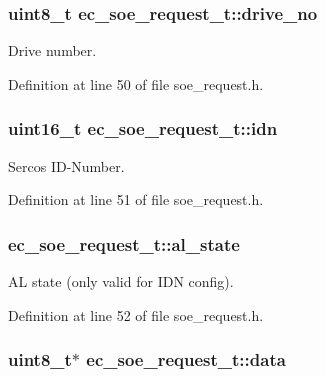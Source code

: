 \subsubsection[{drive\-\_\-no}]{\setlength{\rightskip}{0pt plus 5cm}uint8\-\_\-t {\bf ec\-\_\-soe\-\_\-request\-\_\-t\-::drive\-\_\-no}}\label{structec__soe__request__t_a041ffd0bc617403520b352bcb347a6b5}


\-Drive number. 



\-Definition at line 50 of file soe\-\_\-request.\-h.

\subsubsection[{idn}]{\setlength{\rightskip}{0pt plus 5cm}uint16\-\_\-t {\bf ec\-\_\-soe\-\_\-request\-\_\-t\-::idn}}\label{structec__soe__request__t_a04792e875a94787c20bb370e65b584b7}


\-Sercos \-I\-D-\/\-Number. 



\-Definition at line 51 of file soe\-\_\-request.\-h.

\subsubsection[{al\-\_\-state}]{ {\bf ec\-\_\-soe\-\_\-request\-\_\-t\-::al\-\_\-state}}\label{structec__soe__request__t_aa421217a4fc552dc2411b07010a4520a}


\-A\-L state (only valid for \-I\-D\-N config). 



\-Definition at line 52 of file soe\-\_\-request.\-h.

\subsubsection[{data}]{\setlength{\rightskip}{0pt plus 5cm}uint8\-\_\-t$\ast$ {\bf ec\-\_\-soe\-\_\-request\-\_\-t\-::data}}\label{structec__soe__request__t_a50146c3d308515d01b221f17b528f2f7}


